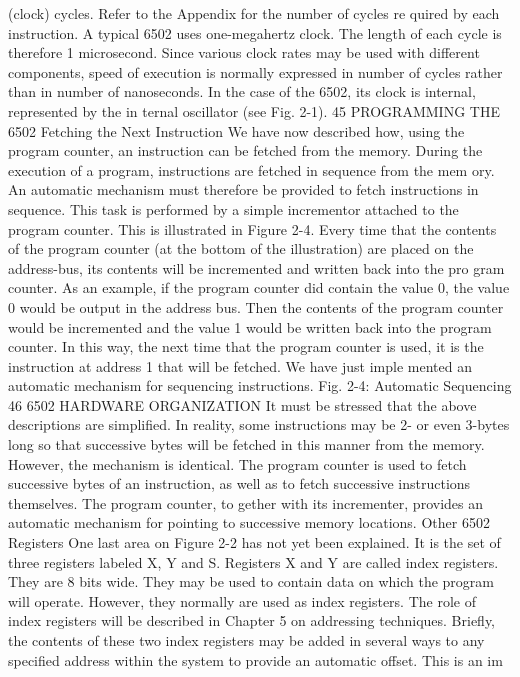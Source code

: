 (clock) cycles. Refer to the Appendix for the number of cycles re
quired by each instruction. A typical 6502 uses one-megahertz
clock. The length of each cycle is therefore 1 microsecond. Since
various clock rates may be used with different components, speed
of execution is normally expressed in number of cycles rather
than in number of nanoseconds.
In the case of the 6502, its clock is internal, represented by the in
ternal oscillator (see Fig. 2-1).
45
PROGRAMMING THE 6502
Fetching the Next Instruction
We have now described how, using the program counter, an
instruction can be fetched from the memory. During the execution
of a program, instructions are fetched in sequence from the mem
ory. An automatic mechanism must therefore be provided to fetch
instructions in sequence. This task is performed by a simple incrementor
attached to the program counter. This is illustrated in
Figure 2-4. Every time that the contents of the program counter
(at the bottom of the illustration) are placed on the address-bus,
its contents will be incremented and written back into the pro
gram counter. As an example, if the program counter did contain
the value 0, the value 0 would be output in the address bus. Then
the contents of the program counter would be incremented and
the value 1 would be written back into the program counter. In
this way, the next time that the program counter is used, it is the
instruction at address 1 that will be fetched. We have just imple
mented an automatic mechanism for sequencing instructions.
Fig. 2-4: Automatic Sequencing
46
6502 HARDWARE ORGANIZATION
It must be stressed that the above descriptions are simplified.
In reality, some instructions may be 2- or even 3-bytes long so that
successive bytes will be fetched in this manner from the memory.
However, the mechanism is identical. The program counter is
used to fetch successive bytes of an instruction, as well as to fetch
successive instructions themselves. The program counter, to
gether with its incrementer, provides an automatic mechanism
for pointing to successive memory locations.
Other 6502 Registers
One last area on Figure 2-2 has not yet been explained. It is the
set of three registers labeled X, Y and S. Registers X and Y are
called index registers. They are 8 bits wide. They may be used to
contain data on which the program will operate. However, they
normally are used as index registers.
The role of index registers will be described in Chapter 5 on
addressing techniques. Briefly, the contents of these two index
registers may be added in several ways to any specified address
within the system to provide an automatic offset. This is an im

